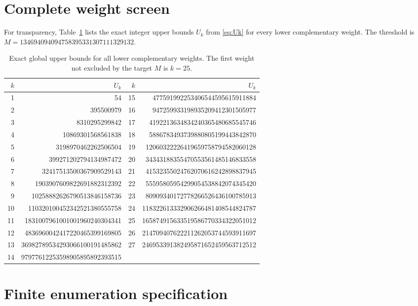 \documentclass[11pt,a4paper]{article}
\theoremstyle{definition}
\theoremstyle{remark}
\begin{document}
\appendix
\section{Complete weight screen}
\label{app:weights}

For transparency, Table~\ref{tab:allweights} lists the exact integer upper
bounds $U_k$ from \eqref{eq:Uk} for every lower complementary weight.  The
threshold is $M=134694094094758395331307111329132$.

\begin{table}[ht]
\centering
\scriptsize
\begin{tabular}{@{}r r@{\qquad}r r@{}}
\toprule
$k$ & $U_k$ & $k$ & $U_k$\\
\midrule
1&54&15&477591992253406544595615911884\\
2&395500979&16&947259933198935209412301505977\\
3&8310295299842&17&4192213634834240365480685545746\\
4&10869301568561838&18&5886783493739880805199443842870\\
5&3198970462262506504&19&12060322226419659758794582060128\\
6&399271202794134987472&20&34343188355470553561485146833558\\
7&32417513500367909529143&21&41532355024762070616242898837945\\
8&1903907609822691882312392&22&55595805954299054538842074345420\\
9&10258882626790513846158736&23&80909340172778266526436100785913\\
10&110320100452342521380555758&24&118322613332906266481408544824787\\
11&1831007961001001960240304341&25&165874915633519586770334322051012\\
12&4836960042417220465399169805&26&214709407622211262053744593911697\\
13&36982789534293066100191485862&27&246953391382495871652459563712512\\
14&97977612253598905895892393515&&\\
\bottomrule
\end{tabular}
\caption{Exact global upper bounds for all lower complementary weights.  The
first weight not excluded by the target $M$ is $k=25$.}
\label{tab:allweights}
\end{table}

\section{Finite enumeration specification}
\label{app:spec}
\end{document}
